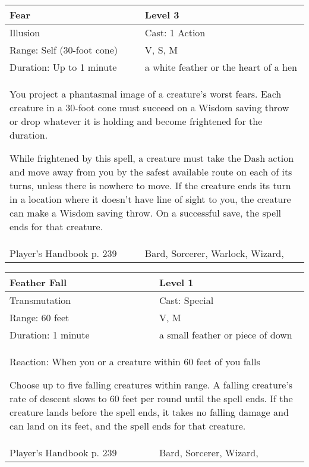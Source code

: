 \documentclass[11pt]{report}
\begin{document}
\begin{table}[H]
	\begin{tabular}{||p{6cm}|p{6cm}||}
		\hline\hline
		\bf{Fear} & Level 3\\ \hline
		Illusion & Cast: 1 Action\\ \hline
		Range: Self (30-foot cone) & V, S, M\\ \hline
		Duration: Up to 1 minute & a white feather or the heart of a hen\\ \hline
		\multicolumn{2}{||p{12cm}||}{You project a phantasmal image of a creature’s worst fears. Each creature in a 30-foot cone must succeed on a Wisdom saving throw or drop whatever it is holding and become frightened for the duration. 

While frightened by this spell, a creature must take the Dash action and move away from you by the safest available route on each of its turns, unless there is nowhere to move. If the creature ends its turn in a location where it doesn’t have line of sight to you, the creature can make a Wisdom saving throw. On a successful save, the spell ends for that creature.}\\ \hline
Player's Handbook p. 239 & Bard, Sorcerer, Warlock, Wizard, \\ \hline\hline
	\end{tabular}
\end{table}

\begin{table}[H]
	\begin{tabular}{||p{6cm}|p{6cm}||}
		\hline\hline
		\bf{Feather Fall} & Level 1\\ \hline
		Transmutation & Cast: Special\\ \hline
		Range: 60 feet & V, M\\ \hline
		Duration: 1 minute & a small feather or piece of down\\ \hline
		\multicolumn{2}{||p{12cm}||}{Reaction: When you or a creature within 60 feet of you falls 

Choose up to five falling creatures within range. A falling creature’s rate of descent slows to 60 feet per round until the spell ends. If the creature lands before the spell ends, it takes no falling damage and can land on its feet, and the spell ends for that creature.}\\ \hline
Player's Handbook p. 239 & Bard, Sorcerer, Wizard, \\ \hline\hline
	\end{tabular}
\end{table}
\end{document}
